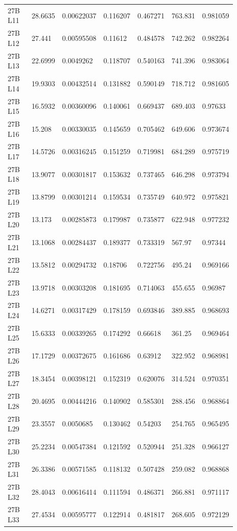 \begin{longtable}{@{}L{0.13\linewidth}L{0.11\linewidth}L{0.13\linewidth}L{0.13\linewidth}L{0.13\linewidth}L{0.13\linewidth}L{0.13\linewidth}@{}}
27B L11 & 28.6635 & 0.00622037 & 0.116207 & 0.467271 & 763.831 & 0.981059 \\
27B L12 & 27.441 & 0.00595508 & 0.11612 & 0.484578 & 742.262 & 0.982264 \\
27B L13 & 22.6999 & 0.0049262 & 0.118707 & 0.540163 & 741.396 & 0.983064 \\
27B L14 & 19.9303 & 0.00432514 & 0.131882 & 0.590149 & 718.712 & 0.981605 \\
27B L15 & 16.5932 & 0.00360096 & 0.140061 & 0.669437 & 689.403 & 0.97633 \\
27B L16 & 15.208 & 0.00330035 & 0.145659 & 0.705462 & 649.606 & 0.973674 \\
27B L17 & 14.5726 & 0.00316245 & 0.151259 & 0.719981 & 684.289 & 0.975719 \\
27B L18 & 13.9077 & 0.00301817 & 0.153632 & 0.737465 & 646.298 & 0.973794 \\
27B L19 & 13.8799 & 0.00301214 & 0.159534 & 0.735749 & 640.972 & 0.975821 \\
27B L20 & 13.173 & 0.00285873 & 0.179987 & 0.735877 & 622.948 & 0.977232 \\
27B L21 & 13.1068 & 0.00284437 & 0.189377 & 0.733319 & 567.97 & 0.97344 \\
27B L22 & 13.5812 & 0.00294732 & 0.18706 & 0.722756 & 495.24 & 0.969166 \\
27B L23 & 13.9718 & 0.00303208 & 0.181695 & 0.714063 & 455.655 & 0.96987 \\
27B L24 & 14.6271 & 0.00317429 & 0.178159 & 0.693846 & 389.885 & 0.968693 \\
27B L25 & 15.6333 & 0.00339265 & 0.174292 & 0.66618 & 361.25 & 0.969464 \\
27B L26 & 17.1729 & 0.00372675 & 0.161686 & 0.63912 & 322.952 & 0.968981 \\
27B L27 & 18.3454 & 0.00398121 & 0.152319 & 0.620076 & 314.524 & 0.970351 \\
27B L28 & 20.4695 & 0.00444216 & 0.140902 & 0.585301 & 288.456 & 0.968864 \\
27B L29 & 23.3557 & 0.0050685 & 0.130462 & 0.54203 & 254.765 & 0.965495 \\
27B L30 & 25.2234 & 0.00547384 & 0.121592 & 0.520944 & 251.328 & 0.966127 \\
27B L31 & 26.3386 & 0.00571585 & 0.118132 & 0.507428 & 259.082 & 0.968868 \\
27B L32 & 28.4043 & 0.00616414 & 0.111594 & 0.486371 & 266.881 & 0.971117 \\
27B L33 & 27.4534 & 0.00595777 & 0.122914 & 0.481817 & 268.605 & 0.972129 \\

\end{longtable}
